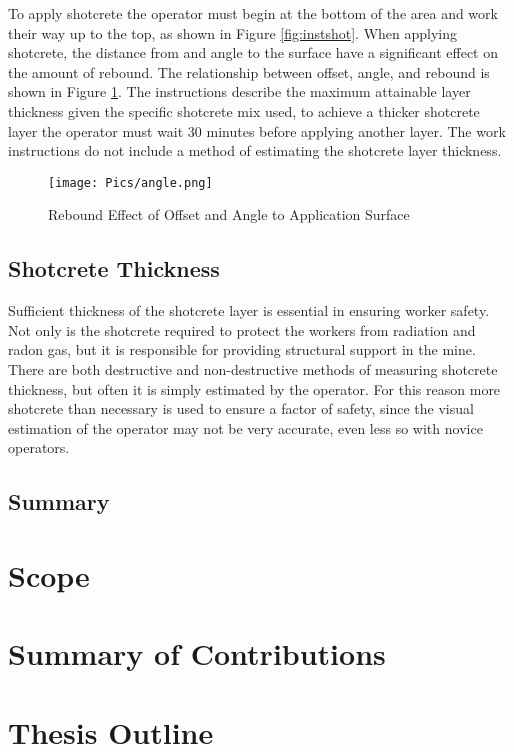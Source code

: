 To apply shotcrete the operator must begin at the bottom of the area and work their way up to the top, as shown in Figure \ref{fig:instshot}. When applying shotcrete, the distance from and angle to the surface have a significant effect on the amount of rebound. The relationship between offset, angle, and rebound is shown in Figure \ref{fig:rebound}. The instructions describe the maximum attainable layer thickness given the specific shotcrete mix used, to achieve a thicker shotcrete layer the operator must wait 30 minutes before applying another layer. The work instructions do not include a method of estimating the shotcrete layer thickness.\\

\begin{figure}
    \centering
    \texttt{[image: Pics/angle.png]}
    \caption{Rebound Effect of Offset and Angle to Application Surface \cite{camedoc}}
    \label{fig:rebound}
\end{figure}

\subsection{Shotcrete Thickness}

Sufficient thickness of the shotcrete layer is essential in ensuring worker safety. Not only is the shotcrete required to protect the workers from radiation and radon gas, but it is responsible for providing structural support in the mine. There are both destructive and non-destructive methods of measuring shotcrete thickness, but often it is simply estimated by the operator. For this reason more shotcrete than necessary is used to ensure a factor of safety, since the visual estimation of the operator may not be very accurate, even less so with novice operators.\\

\subsection{Summary}
\section{Scope}
\label{sec:scope}
\section{Summary of Contributions}
\label{sec:contributions}
\section{Thesis Outline}
\label{sec:outline}